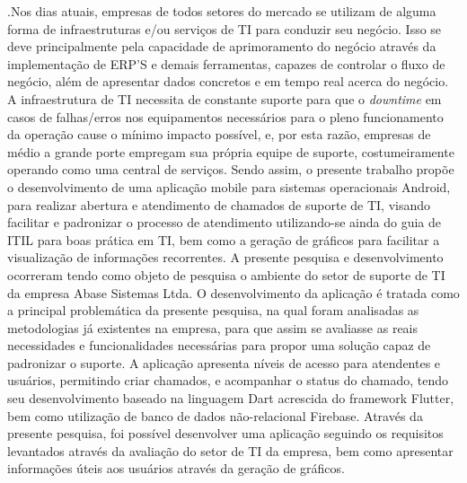 \documentclass[diss]{template/setrem}
\begin{document}
\begin{resumo}

.Nos dias atuais, empresas de todos setores do mercado se utilizam de alguma forma de infraestruturas e/ou serviços de TI para conduzir seu negócio. Isso se deve principalmente pela capacidade de aprimoramento do negócio através da implementação de ERP’S e demais ferramentas, capazes de controlar o fluxo de negócio, além de apresentar dados concretos e em tempo real acerca do negócio. A infraestrutura de TI necessita de constante suporte para que o \textit{downtime} em casos de falhas/erros nos equipamentos necessários para o pleno funcionamento da operação cause o mínimo impacto possível, e, por esta razão, empresas de médio a grande porte empregam sua própria equipe de suporte, costumeiramente operando como uma central de serviços. Sendo assim, o presente trabalho propõe o desenvolvimento de uma aplicação mobile para sistemas operacionais Android, para realizar abertura e atendimento de chamados de suporte de TI, visando facilitar e padronizar o processo de atendimento utilizando-se ainda do guia de ITIL para boas prática em TI, bem como a geração de gráficos para facilitar a visualização de informações recorrentes. A presente pesquisa e desenvolvimento ocorreram tendo como objeto de pesquisa  o ambiente do setor de suporte de TI da empresa Abase Sistemas Ltda. O desenvolvimento da aplicação é tratada como a principal problemática da presente pesquisa, na qual foram analisadas as metodologias já existentes na empresa, para que assim se avaliasse as reais necessidades e funcionalidades necessárias para propor uma solução capaz de padronizar o suporte. A aplicação apresenta níveis de acesso para atendentes e usuários, permitindo criar chamados, e acompanhar o status do chamado, tendo seu desenvolvimento baseado na linguagem Dart acrescida do framework Flutter, bem como utilização de banco de dados não-relacional Firebase. Através da presente pesquisa, foi possível desenvolver uma aplicação seguindo os requisitos levantados através da avaliação do setor de TI da empresa, bem como apresentar informações úteis aos usuários através da geração de gráficos.
\end{resumo}

\begin{singlespaced}    %
    \listoffigures
\end{singlespaced}

\begin{singlespaced}    %
    \listoftables
\end{singlespaced}
\end{document}
